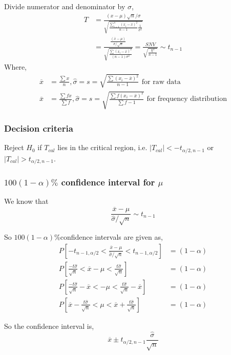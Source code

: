 \documentclass[oneside,11pt,pdftex]{book}%
\numberwithin{equation}{section}
\numberwithin{section}{chapter}
\numberwithin{equation}{chapter}
\begin{document}
Divide numerator and denominator by $ \sigma  $,
\begin{align*}
	T&=\frac{(x-\mu)\sqrt{n}/\sigma }{\sqrt{\frac{\sum_{i=1}^n (x_i-\overline{x})^2}{n-1} \frac{1}{\sigma^2}} }\\
	&=\frac{\frac{(\overline{x}-\mu )}{\sigma/\sqrt{n}}}{\sqrt{\frac{\sum (x_i-\overline{x})^2}{(n-1)\sigma^2}}}=\frac{SNV}{\sqrt{\frac{\chi^2}{n-1}}}\sim t_{n-1}
\end{align*}
Where, \begin{align*}
	\overline{x}&=\frac{\sum x}{n}, \hat{\sigma }=s=\sqrt{\frac{\sum(x_i-\overline{x})^2}{n-1}} \text{ for raw data}\\
	\overline{x}&=\frac{\sum fx}{\sum f}, \hat{\sigma }=s=\sqrt{\frac{\sum f(x_i-\overline{x})^2}{\sum f-1}} \text{ for frequency distribution}
\end{align*}
\subsubsection{Decision criteria}
Reject $ H_0 $ if $ T_{cal} $ lies in the critical region, i.e. $ |T_{cal}| <-t_{\alpha/2, n-1}  $ or $ |T_{cal}|>t_{\alpha/2, n-1} $.

\subsubsection{$ 100(1-\alpha)\% $ confidence interval for $ \mu $}
We know that \[ \frac{\overline{x}-\mu }{\hat{\sigma}/\sqrt{n}}\sim t_{n-1} \]

So $ 100(1-\alpha)\% $confidence intervals are given as,
\begin{align*}
	P\left[-t_{n-1, \alpha/2} < \frac{\overline{x}-\mu }{\hat{\sigma} / \sqrt{n}} < t_{n-1, \alpha/2}\right]&=(1-\alpha)\\
	P\left[\frac{-t \hat{\sigma}}{\sqrt{n}} < \overline{x}- \mu < \frac{t \hat{\sigma }}{\sqrt{n}}\right]&=(1-\alpha)\\
	P\left[\frac{-t \hat{\sigma}}{\sqrt{n}} - \overline{x}< - \mu < \frac{t \hat{\sigma }}{\sqrt{n}}-\overline{x}\right]&=(1-\alpha)\\
	P\left[\overline{x}- \frac{t \hat{\sigma }}{\sqrt{n}} < \mu < \overline{x}+\frac{t\hat{\sigma }}{\sqrt{n}}\right]&=(1-\alpha)
\end{align*}

So the confidence interval is,
\[ \overline{x} \pm t_{\alpha/2, n-1} \frac{\hat{\sigma}}{\sqrt{n}}\]
\end{document}
